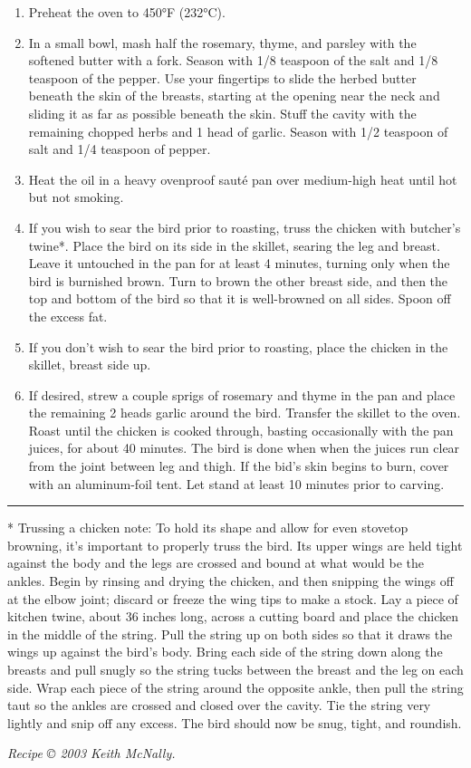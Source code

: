 \begin{enumerate}
  \item Preheat the oven to 450°F (232°C).

  \item In a small bowl, mash half the rosemary, thyme, and parsley with the softened butter with a fork. Season with 1/8 teaspoon of the salt and 1/8 teaspoon of the pepper. Use your fingertips to slide the herbed butter beneath the skin of the breasts, starting at the opening near the neck and sliding it as far as possible beneath the skin. Stuff the cavity with the remaining chopped herbs and 1 head of garlic. Season with 1/2 teaspoon of salt and 1/4 teaspoon of pepper.

  \item Heat the oil in a heavy ovenproof sauté pan over medium-high heat until hot but not smoking.

  \item If you wish to sear the bird prior to roasting, truss the chicken with butcher’s twine*. Place the bird on its side in the skillet, searing the leg and breast. Leave it untouched in the pan for at least 4 minutes, turning only when the bird is burnished brown. Turn to brown the other breast side, and then the top and bottom of the bird so that it is well-browned on all sides. Spoon off the excess fat.

  \item If you don't wish to sear the bird prior to roasting, place the chicken in the skillet, breast side up.

  \item If desired, strew a couple sprigs of rosemary and thyme in the pan and place the remaining 2 heads garlic around the bird. Transfer the skillet to the oven. Roast until the chicken is cooked through, basting occasionally with the pan juices, for about 40 minutes. The bird is done when when the juices run clear from the joint between leg and thigh. If the bid’s skin begins to burn, cover with an aluminum-foil tent. Let stand at least 10 minutes prior to carving.
\end{enumerate}

\hrule
* Trussing a chicken note: To hold its shape and allow for even stovetop browning, it's important to properly truss the bird. Its upper wings are held tight against the body and the legs are crossed and bound at what would be the ankles. Begin by rinsing and drying the chicken, and then snipping the wings off at the elbow joint; discard or freeze the wing tips to make a stock. Lay a piece of kitchen twine, about 36 inches long, across a cutting board and place the chicken in the middle of the string. Pull the string up on both sides so that it draws the wings up against the bird's body. Bring each side of the string down along the breasts and pull snugly so the string tucks between the breast and the leg on each side. Wrap each piece of the string around the opposite ankle, then pull the string taut so the ankles are crossed and closed over the cavity. Tie the string very lightly and snip off any excess. The bird should now be snug, tight, and roundish.

\textit{Recipe © 2003 Keith McNally.}
